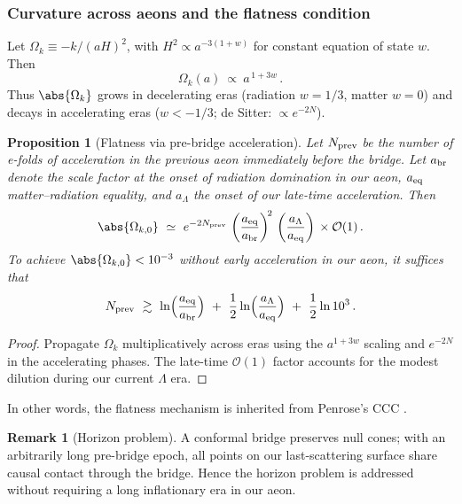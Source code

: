 \documentclass[10pt]{article}
\theoremstyle{definition}
\newtheorem{remark}{Remark}[section]
\theoremstyle{plain}
\newtheorem{proposition}{Proposition}[section]
\begin{document}
\subsubsection*{Curvature across aeons and the flatness condition}\label{subsubsec:uom-main-003}

Let $\Omega_k \equiv -k/(aH)^2$, with $H^2\propto a^{-3(1+w)}$ for constant equation of state $w$. Then
\begin{equation}
\Omega_k(a)\ \propto\ a^{\,1+3w}\,.
\end{equation}
Thus $\abs{\Omega_k}$ grows in decelerating eras (radiation $w=1/3$, matter $w=0$) and decays in accelerating eras ($w<-1/3$; de Sitter: $\propto e^{-2N}$).

\begin{proposition}[Flatness via pre-bridge acceleration]
\label{prop:flatness}
Let $N_{\rm prev}$ be the number of e-folds of acceleration in the previous aeon immediately before the bridge. Let $a_{\rm br}$ denote the scale factor at the onset of radiation domination in our aeon, $a_{\rm eq}$ matter--radiation equality, and $a_\Lambda$ the onset of our late-time acceleration. Then
\begin{equation}
\abs{\Omega_{k,0}}\ \simeq\ e^{-2N_{\rm prev}}\,
\left(\frac{a_{\rm eq}}{a_{\rm br}}\right)^{\!2}\,
\left(\frac{a_\Lambda}{a_{\rm eq}}\right)\,\times \mathcal{O}(1)\,.
\end{equation}
To achieve $\abs{\Omega_{k,0}}<10^{-3}$ without early acceleration in our aeon, it suffices that
\begin{equation}
N_{\rm prev}\ \gtrsim\ \ln\!\Big(\frac{a_{\rm eq}}{a_{\rm br}}\Big)\ +\ \frac{1}{2}\ln\!\Big(\frac{a_\Lambda}{a_{\rm eq}}\Big)\ +\ \frac{1}{2}\ln 10^3\,.
\end{equation}
\end{proposition}

\begin{proof}
Propagate $\Omega_k$ multiplicatively across eras using the $a^{1+3w}$ scaling and $e^{-2N}$ in the accelerating phases. The late-time $\mathcal{O}(1)$ factor accounts for the modest dilution during our current $\Lambda$ era.
\end{proof}
In other words, the flatness mechanism is inherited from Penrose's CCC \cite{Penrose2010Cycles}.

\begin{remark}[Horizon problem]
\label{rem:uom-main-002}
A conformal bridge preserves null cones; with an arbitrarily long pre-bridge epoch, all points on our last-scattering surface share causal contact through the bridge. Hence the horizon problem is addressed without requiring a long inflationary era in our aeon.
\end{remark}
\end{document}
